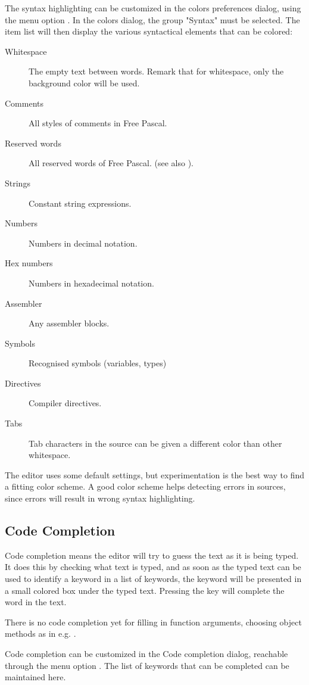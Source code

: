 The syntax highlighting can be customized in the colors preferences dialog,
using the menu option . In the colors dialog, the
group "Syntax" must be selected. The item list will then display the 
various syntactical elements that can be colored:
\begin{description}
\item[Whitespace] The empty text between words. Remark that for whitespace,
only the background color will be used.
\item[Comments] All styles of comments in Free Pascal.
\item[Reserved words] All reserved words of Free Pascal. (see also ).
\item[Strings] Constant string expressions.
\item[Numbers] Numbers in decimal notation.
\item[Hex numbers] Numbers in hexadecimal notation.
\item[Assembler] Any assembler blocks.
\item[Symbols] Recognised symbols (variables, types)
\item[Directives] Compiler directives.
\item[Tabs] Tab characters in the source can be given a different color than 
other whitespace.
\end{description}
The editor uses some default settings, but experimentation is the best way
to find a fitting color scheme. A good color scheme helps detecting errors
in sources, since errors will result in wrong syntax highlighting. 

\subsection{Code Completion}
\label{se:codecompletion}
Code completion means the editor will try to guess the text as it
is being typed. It does this by checking what text is typed, and as soon
as the typed text can be used to identify a keyword in a list of keywords,
the keyword will be presented in a small colored box under the typed text. 
Pressing the  key will complete the word in the text.

There is no code completion yet for filling in function arguments, choosing
object methods as in e.g. \delphi.

Code completion can be customized in the Code completion dialog, reachable 
through the menu option .
The list of keywords that can be completed can be maintained here. 

